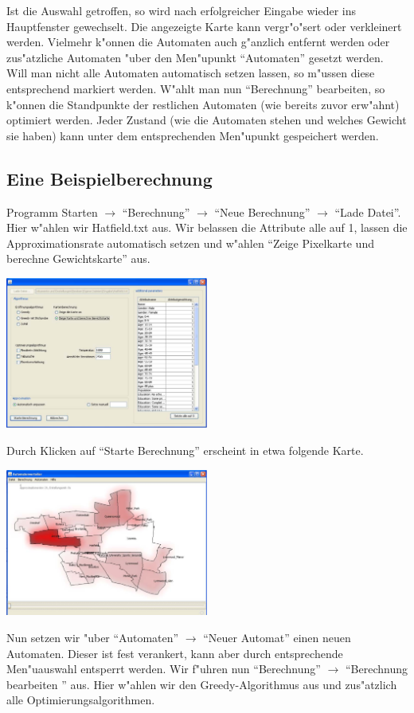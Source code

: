Ist die Auswahl getroffen, so wird nach erfolgreicher Eingabe wieder ins Hauptfenster gewechselt. Die angezeigte Karte kann vergr"o"sert oder verkleinert werden. Vielmehr k"onnen die Automaten auch g"anzlich entfernt werden oder zus"atzliche Automaten "uber den Men"upunkt "`Automaten"' gesetzt werden. Will man nicht alle Automaten automatisch setzen lassen, so m"ussen diese entsprechend markiert werden. W"ahlt man nun "`Berechnung"' bearbeiten, so k"onnen die Standpunkte der restlichen Automaten (wie bereits zuvor erw"ahnt) optimiert werden.
Jeder Zustand (wie die Automaten stehen und welches Gewicht sie haben) kann unter dem entsprechenden Men"upunkt gespeichert werden.

\subsection{Eine Beispielberechnung}
Programm Starten  $\rightarrow$ "`Berechnung"' $\rightarrow$ "`Neue Berechnung"' $\rightarrow$ "`Lade Datei"'. Hier w"ahlen wir Hatfield.txt aus. Wir belassen die Attribute alle auf 1, lassen die Approximationsrate automatisch setzen und w"ahlen "`Zeige Pixelkarte und berechne Gewichtskarte"' aus.

\includegraphics[width=0.5\textwidth]{Gewichtskarte.pdf}

Durch Klicken auf "`Starte Berechnung"' erscheint in etwa folgende Karte.

\includegraphics[width=0.5\textwidth]{Gewichtskarte2.pdf}

Nun setzen wir "uber "`Automaten"' $\rightarrow$ "`Neuer Automat"' einen neuen Automaten. Dieser ist fest verankert, kann aber durch entsprechende Men"uauswahl entsperrt werden. Wir f"uhren nun "`Berechnung"'  $\rightarrow$ "`Berechnung bearbeiten "' aus. Hier w"ahlen wir den Greedy-Algorithmus aus und zus"atzlich alle Optimierungsalgorithmen.

